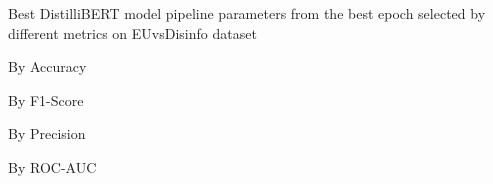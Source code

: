 \begin{table}[!htbp]
    \caption{Best DistilliBERT model pipeline parameters from the best epoch selected by different metrics on EUvsDisinfo dataset}
    \label{tab:euvsdisinfo_distillibert_pipeline_params}
    \centering

    \begin{subtable}[t]{0.48\linewidth}
        \scriptsize
        \caption{By Accuracy}
        
    \end{subtable}
    \hfill
    \begin{subtable}[t]{0.48\linewidth}
        \scriptsize
        \caption{By F1-Score}
        
    \end{subtable}

    \vspace{1em}

    \begin{subtable}[t]{0.48\linewidth}
        \scriptsize
        \caption{By Precision}
        
    \end{subtable}
    \hfill
    \begin{subtable}[t]{0.48\linewidth}
        \scriptsize
        \caption{By ROC-AUC}
        
    \end{subtable}

\end{table}